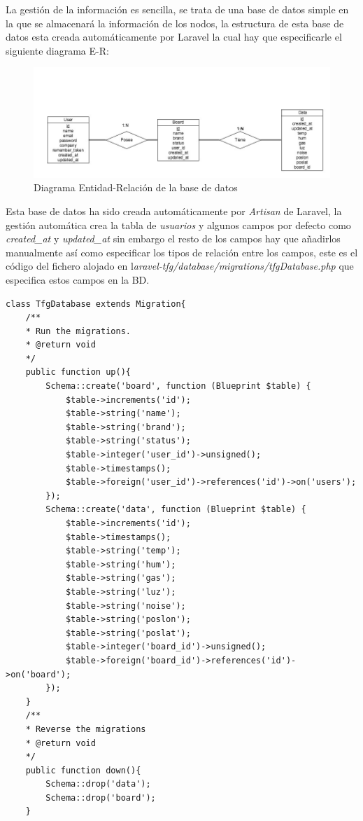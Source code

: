 La gestión de la información es sencilla, se trata de una base de datos simple en la que se almacenará la información de los nodos, la estructura de esta base de datos esta creada automáticamente por Laravel la cual hay que especificarle el siguiente diagrama E-R:
\setlength{\parindent}{0ex}
\begin{figure}[!h]
	\centering
	\includegraphics[width=0.9\linewidth]{figuras/diagramaer}
	\caption{Diagrama Entidad-Relación de la base de datos}
	\label{fig:bd1}
\end{figure}

Esta base de datos ha sido creada automáticamente por \textit{Artisan} de Laravel, la gestión automática crea la tabla de \textit{usuarios} y algunos campos por defecto como \textit{created\_at} y \textit{updated\_at} sin embargo el resto de los campos hay que añadirlos manualmente así como especificar los tipos de relación entre los campos, este es el código del fichero alojado en l\textit{aravel-tfg/database/migrations/tfgDatabase.php} que especifica estos campos en la BD.\\

\begin{lstlisting}[caption=Migración de la base de datos, label=migration]
class TfgDatabase extends Migration{
	/**
	* Run the migrations.
	* @return void
	*/
	public function up(){
		Schema::create('board', function (Blueprint $table) {
			$table->increments('id');
			$table->string('name');
			$table->string('brand');
			$table->string('status');
			$table->integer('user_id')->unsigned();
			$table->timestamps();
			$table->foreign('user_id')->references('id')->on('users');
		});
		Schema::create('data', function (Blueprint $table) {
			$table->increments('id');
			$table->timestamps();
			$table->string('temp');
			$table->string('hum');
			$table->string('gas');
			$table->string('luz');
			$table->string('noise');
			$table->string('poslon');
			$table->string('poslat');
			$table->integer('board_id')->unsigned();
			$table->foreign('board_id')->references('id')->on('board');
		});
	}
	/**
	* Reverse the migrations
	* @return void
	*/
	public function down(){
		Schema::drop('data');
		Schema::drop('board');
	}
\end{lstlisting}

